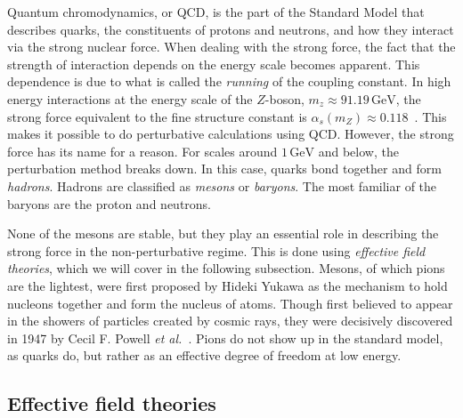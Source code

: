Quantum chromodynamics, or QCD, is the part of the Standard Model that describes quarks, the constituents of protons and neutrons, and how they interact via the strong nuclear force.
When dealing with the strong force, the fact that the strength of interaction depends on the energy scale becomes apparent.
This dependence is due to what is called the \emph{running} of the coupling constant.
In high energy interactions at the energy scale of the $Z$-boson, $m_z \approx 91.19 \, \text{GeV}$, the strong force equivalent to the fine structure constant is $\alpha_s(m_Z) \approx 0.118$~\cite{PDG}.
This makes it possible to do perturbative calculations using QCD.
However, the strong force has its name for a reason.
For scales around $1\, \text{GeV}$ and below, the perturbation method breaks down.
In this case, quarks bond together and form \emph{hadrons}.
Hadrons are classified as \emph{mesons} or \emph{baryons}.
The most familiar of the baryons are the proton and neutrons.

None of the mesons are stable, but they play an essential role in describing the strong force in the non-perturbative regime.
This is done using \emph{effective field theories}, which we will cover in the following subsection.
Mesons, of which pions are the lightest, were first proposed by Hideki Yukawa as the mechanism to hold nucleons together and form the nucleus of atoms.
Though first believed to appear in the showers of particles created by cosmic rays, they were decisively discovered in 1947 by Cecil F. Powell \emph{et al.}~\cite{griffiths:introduction}.
Pions do not show up in the standard model, as quarks do, but rather as an effective degree of freedom at low energy.


\subsection*{Effective field theories}

